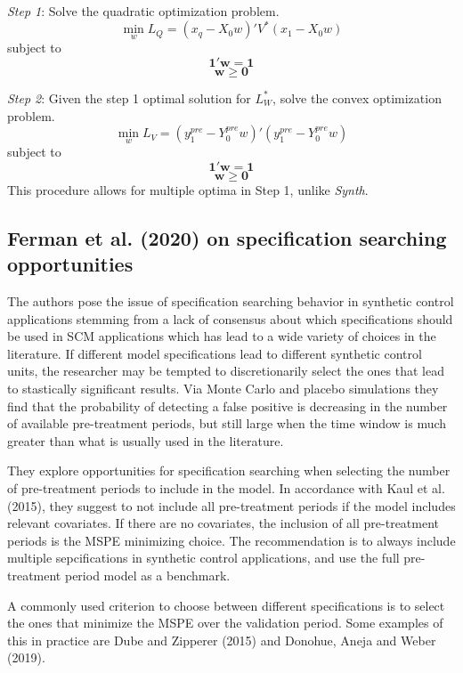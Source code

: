 \documentclass[12pt,a4paper,draft]{article}
\begin{document}
\emph{Step 1}: Solve the quadratic optimization problem.
$$
    \min_w  L_Q = (x_q-X_0 w)' V^* (x_1 - X_0 w)
$$
subject to 
$$ \mathbf{1'w=1} $$
$$ \mathbf{w \ge 0} $$

\emph{Step 2}: Given the step 1 optimal solution for $L_W^*$, solve the 
convex optimization problem.
$$ \min_w  L_V = (y_1^{pre}-Y_0^{pre}w)'(y_1^{pre}-Y_0^{pre}w)$$
subject to
$$ \mathbf{1'w=1} $$
$$ \mathbf{w \ge 0} $$
This procedure allows for multiple optima in Step 1, unlike \emph{Synth}.




\subsection{Ferman et al. (2020) on specification searching opportunities}

The authors pose the issue of specification searching behavior in synthetic 
control applications stemming from a lack of consensus about which specifications should 
be used in SCM applications which has lead to a wide variety of choices in the 
literature. If different model specifications lead to different synthetic control 
units, the researcher may be tempted to discretionarily select the ones that lead 
to stastically significant results. Via Monte Carlo and placebo simulations they 
find that the probability of detecting a false positive is decreasing in the 
number of available pre-treatment periods, but still large when the time window 
is much greater than what is usually used in the literature.

They explore opportunities for specification searching when selecting the number 
of pre-treatment periods to include in the model. In accordance with Kaul et al.
(2015), they suggest to not include all pre-treatment periods if the model 
includes relevant covariates. If there are no covariates, the inclusion of all 
pre-treatment periods is the MSPE minimizing choice. The recommendation is to 
always include multiple sepcifications in synthetic control applications, and 
use the full pre-treatment period model as a benchmark.

A commonly used criterion to choose between different specifications is to 
select the ones that minimize the MSPE over the validation period. Some examples 
of this in practice are Dube and Zipperer (2015) and Donohue, Aneja and Weber 
(2019).
\end{document}
